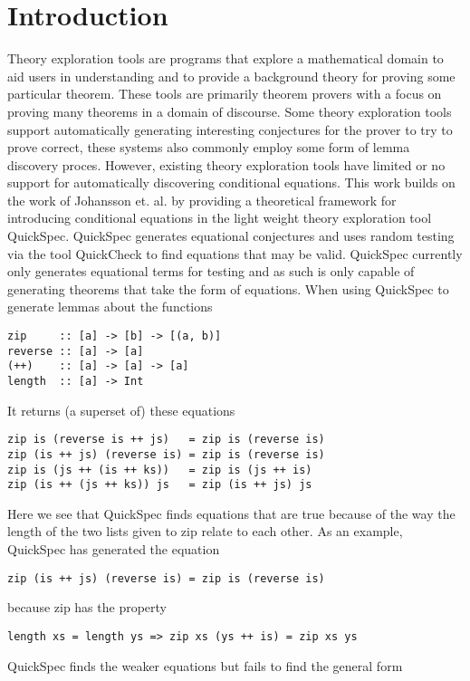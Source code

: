 \section{Introduction}
Theory exploration tools are programs that
explore a mathematical domain to aid users in
understanding and to provide a background theory
for proving some particular theorem\cite{Johansson2014}. 
These tools are primarily theorem provers with a focus
on proving many theorems in a domain of discourse.
Some theory exploration tools support automatically generating
interesting conjectures for the prover to try to prove correct,
these systems also commonly employ some form of lemma discovery proces\cite{heras2013}.
However, existing theory exploration tools have limited or no
support for automatically discovering conditional equations. %
This work builds on the work of Johansson et. al. \cite{Johansson2014}
by providing a theoretical framework for introducing conditional
equations in the light weight theory exploration tool QuickSpec.\cite{Claessen2010} 
QuickSpec generates equational conjectures and uses random testing via the tool QuickCheck \cite{Claessen2000}
to find equations that may be valid. QuickSpec currently only generates
equational terms for testing and as such is only capable of generating
theorems that take the form of equations. 
When using QuickSpec to generate lemmas about the functions
\begin{verbatim}
zip     :: [a] -> [b] -> [(a, b)]
reverse :: [a] -> [a]
(++)    :: [a] -> [a] -> [a]
length  :: [a] -> Int
\end{verbatim}
It returns (a superset of) these equations
\begin{verbatim}
zip is (reverse is ++ js)   = zip is (reverse is)
zip (is ++ js) (reverse is) = zip is (reverse is)
zip is (js ++ (is ++ ks))   = zip is (js ++ is)
zip (is ++ (js ++ ks)) js   = zip (is ++ js) js
\end{verbatim}
Here we see that QuickSpec finds equations that are true
because of the way the length of the two lists given to zip relate
to each other. As an example, QuickSpec has generated the equation
\begin{verbatim}zip (is ++ js) (reverse is) = zip is (reverse is)\end{verbatim}
because zip has the property \begin{verbatim}length xs = length ys => zip xs (ys ++ is) = zip xs ys\end{verbatim}
QuickSpec finds the weaker equations but fails to find the general form
